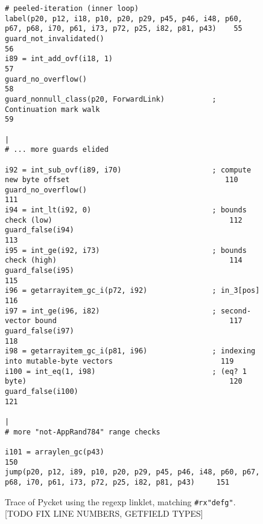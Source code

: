 \begin{figure}[!htbp]
\begin{lstlisting}[style=rptrace-style]
# peeled-iteration (inner loop)
label(p20, p12, i18, p10, p20, p29, p45, p46, i48, p60, p67, p68, i70, p61, i73, p72, p25, i82, p81, p43)    55
guard_not_invalidated()                                                                                      56
i89 = int_add_ovf(i18, 1)                                                                                    57
guard_no_overflow()                                                                                          58
guard_nonnull_class(p20, ForwardLink)           ; Continuation mark walk                                     59
                                                                                                             |
# ... more guards elided

i92 = int_sub_ovf(i89, i70)                     ; compute new byte offset                                    110
guard_no_overflow()                                                                                          111
i94 = int_lt(i92, 0)                            ; bounds check (low)                                         112
guard_false(i94)                                                                                             113
i95 = int_ge(i92, i73)                          ; bounds check (high)                                        114
guard_false(i95)                                                                                             115
i96 = getarrayitem_gc_i(p72, i92)               ; in_3[pos]                                                  116
i97 = int_ge(i96, i82)                          ; second-vector bound                                        117
guard_false(i97)                                                                                             118
i98 = getarrayitem_gc_i(p81, i96)               ; indexing into mutable-byte vectors                         119
i100 = int_eq(1, i98)                           ; (eq? 1 byte)                                               120
guard_false(i100)                                                                                            121
                                                                                                             |
# more "not-AppRand784" range checks

i101 = arraylen_gc(p43)                                                                                      150
jump(p20, p12, i89, p10, p20, p29, p45, p46, i48, p60, p67, p68, i70, p61, i73, p72, p25, i82, p81, p43)     151
\end{lstlisting}

\caption{\small Trace of Pycket using the regexp linklet, matching
		{\tt\#rx"defg"}. [TODO FIX LINE NUMBERS, GETFIELD TYPES]}
\label{fig:regexp-linklet-big-trace}
\end{figure}